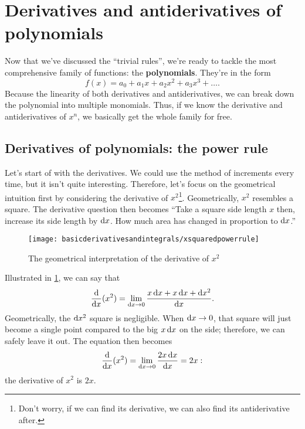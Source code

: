 \section{Derivatives and antiderivatives of polynomials}

Now that we've discussed the ``trivial rules'', we're ready to tackle the most comprehensive family of functions: the \textbf{polynomials}. They're in the form
\begin{equation*}
    f(x) = a_0 + a_1x + a_2x^2 + a_3x^3 + \dots.
\end{equation*}
Because the linearity of both derivatives and antiderivatives, we can break down the polynomial into multiple monomials. Thus, if we know the derivative and antiderivatives of $x^n$, we basically get the whole family for free.

\subsection{Derivatives of polynomials: the power rule}
\label{sec:derivativespowerrule}

Let's start of with the derivatives. We could use the method of increments every time, but it isn't quite interesting. Therefore, let's focus on the geometrical intuition first by considering the derivative of $x^2$\footnote{Don't worry, if we can find its derivative, we can also find its antiderivative after.}. Geometrically, $x^2$ resembles a square. The derivative question then becomes ``Take a square side length $x$ then, increase its side length by $\odif{x}$. How much area has changed in proportion to $\odif{x}$.''

\begin{figure}[b]
    \centering
    \texttt{[image: basicderivativesandintegrals/xsquaredpowerrule]}
    \caption{The geometrical interpretation of the derivative of $x^2$}
    \label{fig:xsquaredpowerrule}
\end{figure}
Illustrated in \cref{fig:xsquaredpowerrule}, we can say that
\begin{equation}
    \odv*{(x^2)}{x} = \lim_{\odif{x} \appr 0} \frac{x\odif{x} + x\odif{x} + \odif{x}^2}{\odif{x}}. \label{eq:xsquaredpowerrule}
\end{equation}
Geometrically, the $\odif{x}^2$ square is negligible. When $\odif{x} \appr 0$, that square will just become a single point compared to the big $x\odif{x}$ on the side; therefore, we can safely leave it out. The equation then becomes
\begin{align*}
    \odv*{(x^2)}{x} = \lim_{\odif{x} \appr 0}\frac{2x\odif{x}}{\odif{x}} = 2x:
\end{align*}
the derivative of $x^2$ is $2x$.

